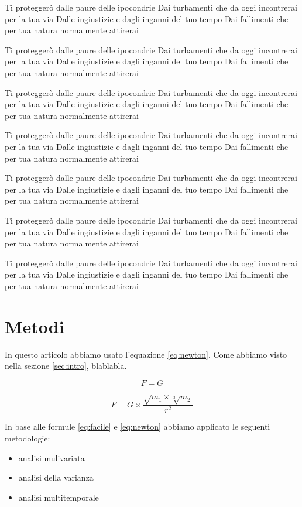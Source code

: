 \documentclass[12pt]{article}
\begin{document}
\bigskip
\noindent Ti proteggerò dalle paure delle ipocondrie
Dai turbamenti che da oggi incontrerai per la tua via
Dalle ingiustizie e dagli inganni del tuo tempo
Dai fallimenti che per tua natura normalmente attirerai

Ti proteggerò dalle paure delle ipocondrie
Dai turbamenti che da oggi incontrerai per la tua via
Dalle ingiustizie e dagli inganni del tuo tempo
Dai fallimenti che per tua natura normalmente attirerai

Ti proteggerò dalle paure delle ipocondrie
Dai turbamenti che da oggi incontrerai per la tua via
Dalle ingiustizie e dagli inganni del tuo tempo
Dai fallimenti che per tua natura normalmente attirerai

Ti proteggerò dalle paure delle ipocondrie
Dai turbamenti che da oggi incontrerai per la tua via
Dalle ingiustizie e dagli inganni del tuo tempo
Dai fallimenti che per tua natura normalmente attirerai

Ti proteggerò dalle paure delle ipocondrie
Dai turbamenti che da oggi incontrerai per la tua via
Dalle ingiustizie e dagli inganni del tuo tempo
Dai fallimenti che per tua natura normalmente attirerai

Ti proteggerò dalle paure delle ipocondrie
Dai turbamenti che da oggi incontrerai per la tua via
Dalle ingiustizie e dagli inganni del tuo tempo
Dai fallimenti che per tua natura normalmente attirerai

Ti proteggerò dalle paure delle ipocondrie
Dai turbamenti che da oggi incontrerai per la tua via
Dalle ingiustizie e dagli inganni del tuo tempo
Dai fallimenti che per tua natura normalmente attirerai

\section{Metodi}
In questo articolo abbiamo usato l'equazione \ref{eq:newton}. Come abbiamo visto nella sezione \ref{sec:intro}, blablabla.

\begin{equation}
    F = G
    \label{eq:facile}
\end{equation}

\begin{equation}
    F = G \times \frac{\sqrt{m_1 \times \sqrt[3]{m_2}}}{r^2}
    \label{eq:newton}
\end{equation}

In base alle formule \ref{eq:facile} e \ref{eq:newton} abbiamo applicato le seguenti metodologie:
\begin{itemize}
    \item analisi mulivariata
    \item analisi della varianza
    \item analisi multitemporale
\end{itemize}
\end{document}
